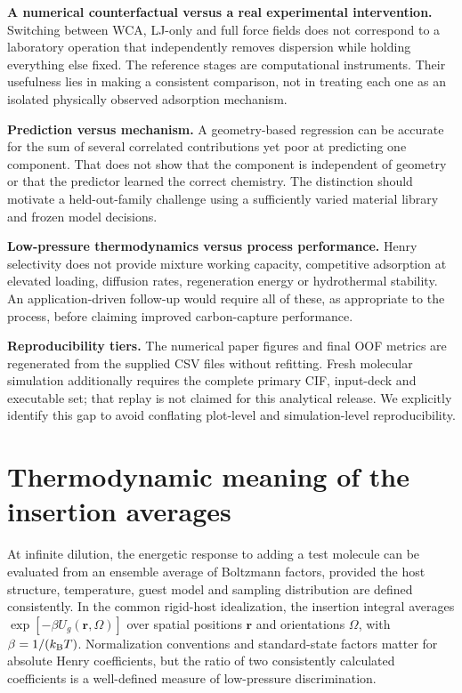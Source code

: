 \documentclass[11pt,a4paper]{article}
\begin{document}
\textbf{A numerical counterfactual versus a real experimental intervention.} Switching between WCA, LJ-only and full force fields does not correspond to a laboratory operation that independently removes dispersion while holding everything else fixed. The reference stages are computational instruments. Their usefulness lies in making a consistent comparison, not in treating each one as an isolated physically observed adsorption mechanism.

\textbf{Prediction versus mechanism.} A geometry-based regression can be accurate for the sum of several correlated contributions yet poor at predicting one component. That does not show that the component is independent of geometry or that the predictor learned the correct chemistry. The distinction should motivate a held-out-family challenge using a sufficiently varied material library and frozen model decisions.

\textbf{Low-pressure thermodynamics versus process performance.} Henry selectivity does not provide mixture working capacity, competitive adsorption at elevated loading, diffusion rates, regeneration energy or hydrothermal stability. An application-driven follow-up would require all of these, as appropriate to the process, before claiming improved carbon-capture performance.

\textbf{Reproducibility tiers.} The numerical paper figures and final OOF metrics are regenerated from the supplied CSV files without refitting. Fresh molecular simulation additionally requires the complete primary CIF, input-deck and executable set; that replay is not claimed for this analytical release. We explicitly identify this gap to avoid conflating plot-level and simulation-level reproducibility.


\section{Thermodynamic meaning of the insertion averages}

At infinite dilution, the energetic response to adding a test molecule can be evaluated from an ensemble average of Boltzmann factors, provided the host structure, temperature, guest model and sampling distribution are defined consistently. In the common rigid-host idealization, the insertion integral averages $\exp[-\beta U_g(\mathbf r,\Omega)]$ over spatial positions $\mathbf r$ and orientations $\Omega$, with $\beta=1/(k_{\rm B}T)$. Normalization conventions and standard-state factors matter for absolute Henry coefficients, but the ratio of two consistently calculated coefficients is a well-defined measure of low-pressure discrimination.
\end{document}
